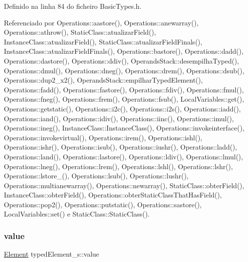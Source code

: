 Definido na linha 84 do ficheiro Basic\+Types.\+h.



Referenciado por Operations\+::aastore(), Operations\+::anewarray(), Operations\+::athrow(), Static\+Class\+::atualizar\+Field(), Instance\+Class\+::atualizar\+Field(), Static\+Class\+::atualizar\+Field\+Finals(), Instance\+Class\+::atualizar\+Field\+Finals(), Operations\+::bastore(), Operations\+::dadd(), Operations\+::dastore(), Operations\+::ddiv(), Operands\+Stack\+::desempilha\+Typed(), Operations\+::dmul(), Operations\+::dneg(), Operations\+::drem(), Operations\+::dsub(), Operations\+::dup2\+\_\+x2(), Operands\+Stack\+::empilhar\+Typed\+Element(), Operations\+::fadd(), Operations\+::fastore(), Operations\+::fdiv(), Operations\+::fmul(), Operations\+::fneg(), Operations\+::frem(), Operations\+::fsub(), Local\+Variables\+::get(), Operations\+::getstatic(), Operations\+::i2c(), Operations\+::i2s(), Operations\+::iadd(), Operations\+::iand(), Operations\+::idiv(), Operations\+::iinc(), Operations\+::imul(), Operations\+::ineg(), Instance\+Class\+::\+Instance\+Class(), Operations\+::invokeinterface(), Operations\+::invokevirtual(), Operations\+::irem(), Operations\+::ishl(), Operations\+::ishr(), Operations\+::isub(), Operations\+::iushr(), Operations\+::ladd(), Operations\+::land(), Operations\+::lastore(), Operations\+::ldiv(), Operations\+::lmul(), Operations\+::lneg(), Operations\+::lrem(), Operations\+::lshl(), Operations\+::lshr(), Operations\+::lstore\+\_(), Operations\+::lsub(), Operations\+::lushr(), Operations\+::multianewarray(), Operations\+::newarray(), Static\+Class\+::obter\+Field(), Instance\+Class\+::obter\+Field(), Operations\+::obter\+Static\+Class\+That\+Has\+Field(), Operations\+::pop2(), Operations\+::putstatic(), Operations\+::sastore(), Local\+Variables\+::set() e Static\+Class\+::\+Static\+Class().

\mbox{\label{structtypedElement__s_a31beb2ade81f8acacfc312bba3ab2086}} 
\subsubsection{\texorpdfstring{value}{value}}
{\footnotesize\ttfamily \hyperlink{BasicTypes_8h_a8132f4f0515064141e31e606660df561}{Element} typed\+Element\+\_\+s\+::value}



